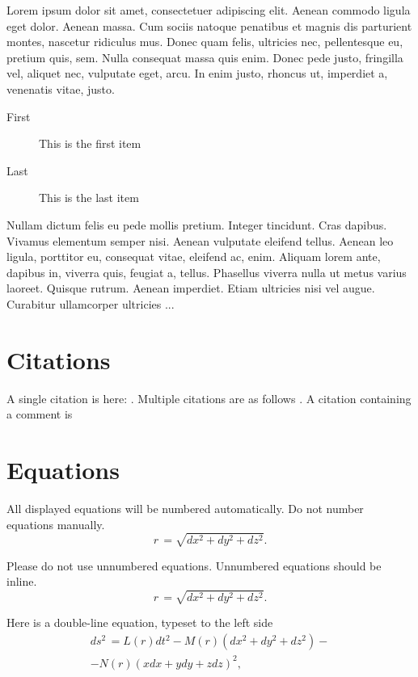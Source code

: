 \documentclass[12pt]{article}
\begin{document}
Lorem ipsum dolor sit amet, consectetuer adipiscing elit. Aenean commodo ligula eget dolor. Aenean massa. Cum sociis natoque penatibus et magnis dis parturient montes, nascetur ridiculus mus. Donec quam felis, ultricies nec, pellentesque eu, pretium quis, sem. Nulla consequat massa quis enim. Donec pede justo, fringilla vel, aliquet nec, vulputate eget, arcu. In enim justo, rhoncus ut, imperdiet a, venenatis vitae, justo. 
\begin{description}
        \item[First] This is the first item
        \item[Last] This is the last item
\end{description}
Nullam dictum felis eu pede mollis pretium. Integer tincidunt. Cras dapibus. Vivamus elementum semper nisi. Aenean vulputate eleifend tellus. Aenean leo ligula, porttitor eu, consequat vitae, eleifend ac, enim. Aliquam lorem ante, dapibus in, viverra quis, feugiat a, tellus. Phasellus viverra nulla ut metus varius laoreet. Quisque rutrum. Aenean imperdiet. Etiam ultricies nisi vel augue. Curabitur ullamcorper ultricies ...

\section*{Citations}

A single citation is here: \cite{eddy}. Multiple citations are as follows \cite{bondi,Pez,La2}. A citation containing a comment is \cite[see p.\,5]{eddy}



\section*{Equations}

All displayed equations will be numbered automatically. Do not number equations manually.
\begin{equation}
r\,= \sqrt{dx^{2} + dy^{2} + dz^{2}}.
\end{equation}

Please do not use unnumbered equations. Unnumbered equations should be inline.
$$
r\,= \sqrt{dx^{2} + dy^{2} + dz^{2}}.
$$


Here is a double-line equation, typeset to the left side
$$
\begin{array}{ll}
%
\displaystyle
ds^{2}\,= L(r)dt^{2} - M(r)(dx^{2} + dy^{2} + dz^{2}) -\\[+8pt]  %
%
\displaystyle
- N(r)(xdx + ydy + zdz)^{2}, \\%
\end{array}
$$
\end{document}
